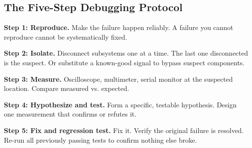 \documentclass[11pt,letterpaper,twoside,openany]{book}
\begin{document}
\subsection{The Five-Step Debugging Protocol}
\textbf{Step 1: Reproduce.} Make the failure happen reliably. A failure you cannot reproduce cannot be systematically fixed.

\textbf{Step 2: Isolate.} Disconnect subsystems one at a time. The last one disconnected is the suspect. Or substitute a known-good signal to bypass suspect components.

\textbf{Step 3: Measure.} Oscilloscope, multimeter, serial monitor at the suspected location. Compare measured vs. expected.

\textbf{Step 4: Hypothesize and test.} Form a specific, testable hypothesis. Design one measurement that confirms or refutes it.

\textbf{Step 5: Fix and regression test.} Fix it. Verify the original failure is resolved. Re-run all previously passing tests to confirm nothing else broke.
\end{document}
